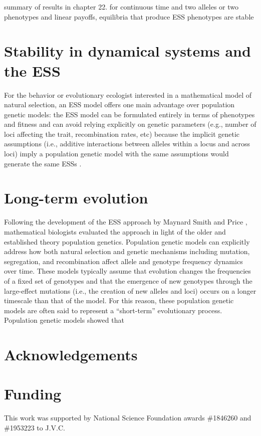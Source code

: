 \documentclass[11pt]{article}
\begin{document}

summary of results in chapter 22. for continuous time and two alleles or two phenotypes and linear payoffs, equilibria that produce ESS phenotypes are stable \cite{Hofbauer:Sigmund:1998}

\section{Stability in dynamical systems and the ESS}

For the behavior or evolutionary ecologist interested in a mathematical model of natural selection, an ESS model offers one main advantage over population genetic models: the ESS model can be formulated entirely in terms of phenotypes and fitness and can avoid relying explicitly on genetic parameters (e.g., number of loci affecting the trait, recombination rates, etc) because the implicit genetic assumptions (i.e., additive interactions between alleles within a locus and across loci) imply a population genetic model with the same assumptions would generate the same ESSs \cite{Eshel:1982}.

\section{Long-term evolution}

Following the development of the ESS approach by Maynard Smith and Price \cite{Maynard-Smith:Price:1973}, mathematical biologists evaluated the approach in light of the older and established theory population genetics. Population genetic models can explicitly address how both natural selection and genetic mechanisms including mutation, segregation, and recombination affect allele and genotype frequency dynamics over time. These models typically assume that evolution changes the frequencies of a fixed set of genotypes and that the emergence of new genotypes through the large-effect mutations (i.e., the creation of new alleles and loci) occurs on a longer timescale than that of the model. For this reason, these population genetic models are often said to represent a ``short-term'' evolutionary process. Population genetic models showed that \cite{Cavalli-Sforza:Feldman:1978,Eshel:1982}




\section{Acknowledgements}

\section{Funding}

This work was supported by National Science Foundation awards \#1846260 and \#1953223 to J.V.C.

\clearpage
\printbibliography
\end{document}

